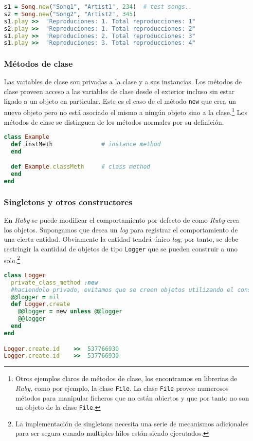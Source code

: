 \begin{lstlisting}[language=Ruby]
s1 = Song.new("Song1", "Artist1", 234)  # test songs..
s2 = Song.new("Song2", "Artist2", 345)
s1.play	>>	"Reproduciones: 1. Total reproducciones: 1"
s2.play	>>	"Reproduciones: 1. Total reproducciones: 2"
s1.play	>>	"Reproduciones: 2. Total reproducciones: 3"
s1.play	>>	"Reproduciones: 3. Total reproducciones: 4"
\end{lstlisting}

\subsubsection{Métodos de clase}
Las variables de clase son privadas a la clase y a sus instancias. Los métodos de clase proveen acceso a las variables de clase desde el exterior incluso sin estar ligado a un objeto en particular. 
Este es el caso de el método \texttt{new} que crea un nuevo objeto pero no está asociado el mismo a ningún objeto sino a la clase.\footnote{Otros ejemplos claros de métodos de clase, los encontramos en librerias de \textit{Ruby}, como por ejemplo, la clase \texttt{File}. La clase \texttt{File} provee numerosos métodos para manipular ficheros que no están abiertos y que por tanto no son un objeto de la clase \texttt{File}.}
Los métodos de clase se distinguen de los métodos normales por su definición.

\begin{lstlisting}[language=Ruby]
class Example
  def instMeth              # instance method
  end

  def Example.classMeth     # class method
  end
end
\end{lstlisting}

\subsubsection{Singletons y otros constructores}
En \textit{Ruby} se puede modificar el comportamiento por defecto de como \textit{Ruby} crea los objetos. Supongamos que desea un \textit{log} para registrar el comportamiento de una cierta entidad. Obviamente la entidad tendrá único \textit{log}, por tanto, se debe restringir la cantidad de objetos de tipo \texttt{Logger} que se pueden construir a uno solo.\footnote{La implementación de singletons necesita una serie de mecanismos adicionales para ser segura cuando multiples hilos están siendo ejecutados.}

\begin{lstlisting}[language=Ruby]
class Logger
  private_class_method :new 
  #haciendolo privado, evitamos que se creen objetos utilizando el constructor por defecto. 
  @@logger = nil
  def Logger.create
    @@logger = new unless @@logger
    @@logger
  end
end

Logger.create.id	>>	537766930
Logger.create.id	>>	537766930
\end{lstlisting}

